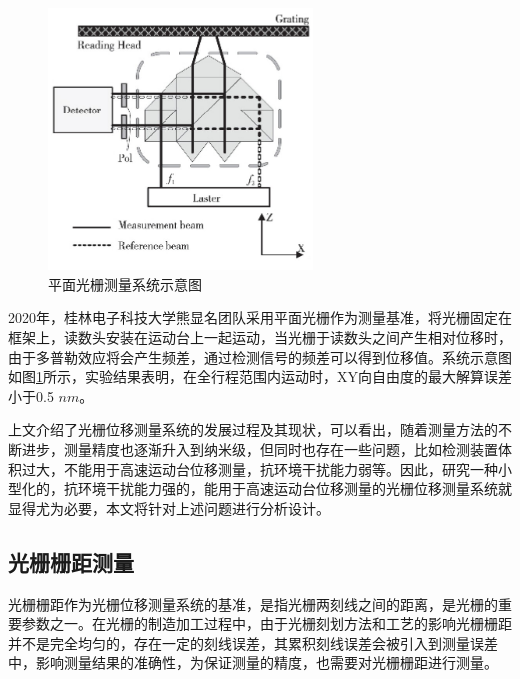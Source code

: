 \documentclass[type=master,oneside]{fduthesis}
\begin{document}
\begin{figure}[htb]
  \centering
  \includegraphics[width=7cm]{1-fig/桂林电子科技大学.jpg}
  \caption{平面光栅测量系统示意图}
  \label{fig:平面光栅测量系统示意图}
\end{figure}


2020年，桂林电子科技大学熊显名团队\cite{魏莉佳2020高精度平面光栅位移测量系统}采用平面光栅作为测量基准，将光栅固定在框架上，读数头安装在运动台上一起运动，当光栅于读数头之间产生相对位移时，由于多普勒效应将会产生频差，通过检测信号的频差可以得到位移值。系统示意图如图\ref{fig:平面光栅测量系统示意图}所示，实验结果表明，在全行程范围内运动时，XY向自由度的最大解算误差小于0.5 $nm$。

上文介绍了光栅位移测量系统的发展过程及其现状，可以看出，随着测量方法的不断进步，测量精度也逐渐升入到纳米级，但同时也存在一些问题，比如检测装置体积过大，不能用于高速运动台位移测量，抗环境干扰能力弱等。因此，研究一种小型化的，抗环境干扰能力强的，能用于高速运动台位移测量的光栅位移测量系统就显得尤为必要，本文将针对上述问题进行分析设计。




\subsection{光栅栅距测量}
光栅栅距作为光栅位移测量系统的基准，是指光栅两刻线之间的距离，是光栅的重要参数之一。在光栅的制造加工过程中，由于光栅刻划方法和工艺的影响光栅栅距并不是完全均匀的，存在一定的刻线误差，其累积刻线误差会被引入到测量误差中，影响测量结果的准确性，为保证测量的精度，也需要对光栅栅距进行测量。
\end{document}
